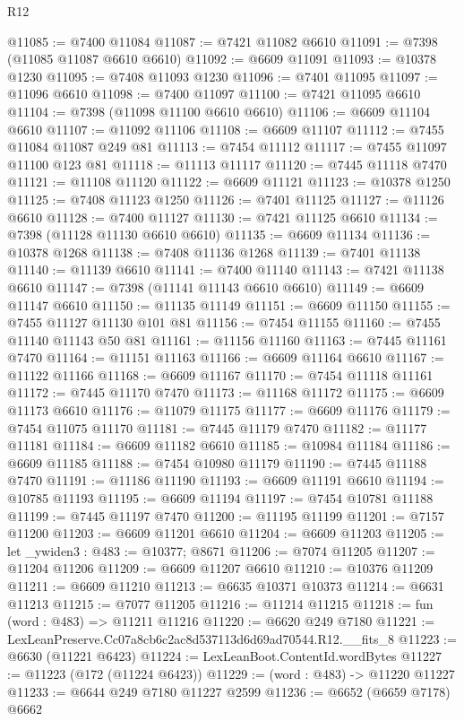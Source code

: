 \begin{lexlean}{R12}
\begin{coremodule}
@11085 := @7400 @11084
@11087 := @7421 @11082 @6610
@11091 := @7398 (@11085 @11087 @6610 @6610)
@11092 := @6609 @11091
@11093 := @10378 @1230
@11095 := @7408 @11093 @1230
@11096 := @7401 @11095
@11097 := @11096 @6610
@11098 := @7400 @11097
@11100 := @7421 @11095 @6610
@11104 := @7398 (@11098 @11100 @6610 @6610)
@11106 := @6609 @11104 @6610
@11107 := @11092 @11106
@11108 := @6609 @11107
@11112 := @7455 @11084 @11087 @249 @81
@11113 := @7454 @11112
@11117 := @7455 @11097 @11100 @123 @81
@11118 := @11113 @11117
@11120 := @7445 @11118 @7470
@11121 := @11108 @11120
@11122 := @6609 @11121
@11123 := @10378 @1250
@11125 := @7408 @11123 @1250
@11126 := @7401 @11125
@11127 := @11126 @6610
@11128 := @7400 @11127
@11130 := @7421 @11125 @6610
@11134 := @7398 (@11128 @11130 @6610 @6610)
@11135 := @6609 @11134
@11136 := @10378 @1268
@11138 := @7408 @11136 @1268
@11139 := @7401 @11138
@11140 := @11139 @6610
@11141 := @7400 @11140
@11143 := @7421 @11138 @6610
@11147 := @7398 (@11141 @11143 @6610 @6610)
@11149 := @6609 @11147 @6610
@11150 := @11135 @11149
@11151 := @6609 @11150
@11155 := @7455 @11127 @11130 @101 @81
@11156 := @7454 @11155
@11160 := @7455 @11140 @11143 @50 @81
@11161 := @11156 @11160
@11163 := @7445 @11161 @7470
@11164 := @11151 @11163
@11166 := @6609 @11164 @6610
@11167 := @11122 @11166
@11168 := @6609 @11167
@11170 := @7454 @11118 @11161
@11172 := @7445 @11170 @7470
@11173 := @11168 @11172
@11175 := @6609 @11173 @6610
@11176 := @11079 @11175
@11177 := @6609 @11176
@11179 := @7454 @11075 @11170
@11181 := @7445 @11179 @7470
@11182 := @11177 @11181
@11184 := @6609 @11182 @6610
@11185 := @10984 @11184
@11186 := @6609 @11185
@11188 := @7454 @10980 @11179
@11190 := @7445 @11188 @7470
@11191 := @11186 @11190
@11193 := @6609 @11191 @6610
@11194 := @10785 @11193
@11195 := @6609 @11194
@11197 := @7454 @10781 @11188
@11199 := @7445 @11197 @7470
@11200 := @11195 @11199
@11201 := @7157 @11200
@11203 := @6609 @11201 @6610
@11204 := @6609 @11203
@11205 := let _ywiden3 : @483 := @10377; @8671
@11206 := @7074 @11205
@11207 := @11204 @11206
@11209 := @6609 @11207 @6610
@11210 := @10376 @11209
@11211 := @6609 @11210
@11213 := @6635 @10371 @10373
@11214 := @6631 @11213
@11215 := @7077 @11205
@11216 := @11214 @11215
@11218 := fun (word : @483) => @11211 @11216
@11220 := @6620 @249 @7180
@11221 := LexLeanPreserve.Cc07a8cb6c2ac8d537113d6d69ad70544.R12.__fits_8
@11223 := @6630 (@11221 @6423)
@11224 := LexLeanBoot.ContentId.wordBytes
@11227 := @11223 (@172 (@11224 @6423))
@11229 := (word : @483) -> @11220 @11227
@11233 := @6644 @249 @7180 @11227 @2599
@11236 := @6652 (@6659 @7178) @6662

\end{coremodule}
\end{lexlean}
